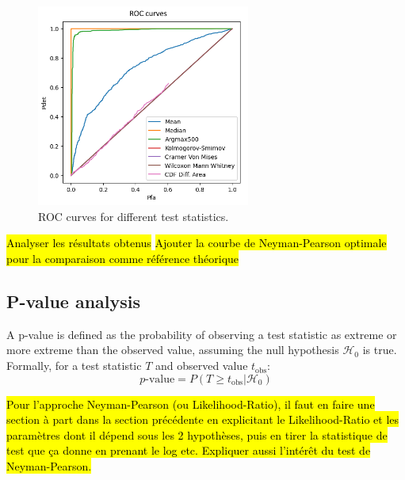\documentclass{article}
\begin{document}
\begin{figure}[H]
\centering
\includegraphics[width=7cm]{img/roc_curves.png}
\caption{ROC curves for different test statistics.}
\label{fig:roc}
\end{figure}

\hl{Analyser les résultats obtenus}
\hl{Ajouter la courbe de Neyman-Pearson optimale pour la comparaison comme référence théorique}

\subsection{P-value analysis}

A p-value is defined as the probability of observing a test statistic as extreme or more extreme than the observed value, assuming the null hypothesis ${\mathcal{H}}_0$ is true. Formally, for a test statistic $T$ and observed value $t_{\text{obs}}$:
\begin{equation}
p\text{-value} = P(T \geq t_{\text{obs}} | {\mathcal{H}}_0)
\end{equation}

\hl{Pour l'approche Neyman-Pearson (ou Likelihood-Ratio), il faut en faire une section à part dans la section précédente en explicitant le Likelihood-Ratio et les paramètres dont il dépend sous les 2 hypothèses, puis en tirer la statistique de test que ça donne en prenant le log etc. Expliquer aussi l'intérêt du test de Neyman-Pearson.}
\end{document}
